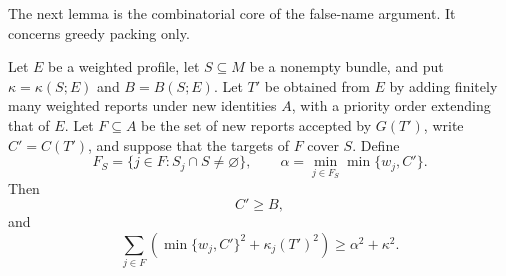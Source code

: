 \documentclass[format=acmsmall, review=false]{acmart}
\begin{document}
The next lemma is the combinatorial core of the false-name
argument. It concerns greedy packing only.

\begin{lemma}
\label{lem:certificate}
Let \(E\) be a weighted profile, let \(S\subseteq M\) be a
nonempty bundle, and put \(\kappa=\kappa(S;E)\) and
\(B=B(S;E)\). Let \(T'\) be obtained from \(E\) by adding
finitely many weighted reports under new identities \(A\), with
a priority order extending that of \(E\). Let \(F\subseteq A\)
be the set of new reports accepted by \(G(T')\), write
\(C'=C(T')\), and suppose that the targets of \(F\) cover \(S\).
Define
\[
F_S=\{j\in F:S_j\cap S\ne\varnothing\},
\qquad
\alpha=\min_{j\in F_S}\min\{w_j,C'\}.
\]
Then
\begin{equation}\label{eq:C-comparison}
C'\ge B,
\end{equation}
and
\begin{equation}\label{eq:certificate}
\sum_{j\in F}
\left(
\min\{w_j,C'\}^2+\kappa_j(T')^2
\right)
\ge\alpha^2+\kappa^2.
\end{equation}
\end{lemma}
\end{document}
